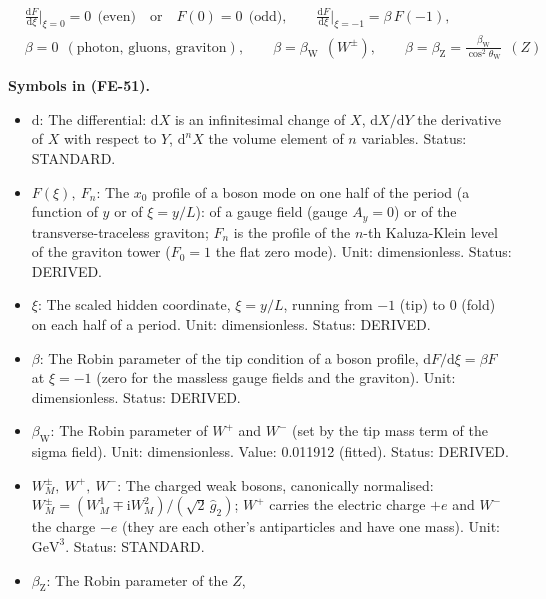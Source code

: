 \documentclass[
  10pt,
]{article}
\providecommand{\tightlist}{%
  \setlength{\itemsep}{0pt}\setlength{\parskip}{0pt}}
\begin{document}
\[
\begin{aligned}
&\frac{\mathrm{d}F}{\mathrm{d}\xi}\Big\vert_{\xi=0} = 0\ \ \text{(even)}\quad\text{or}\quad F(0) =
 0\ \ \text{(odd)},\qquad
 \frac{\mathrm{d}F}{\mathrm{d}\xi}\Big\vert_{\xi=-1} = \beta\,F(-1),\\
&\beta = 0\ \ (\text{photon, gluons, graviton}),\qquad \beta = \beta_{\mathrm{W}}\ \ (W^\pm),\qquad
 \beta = \beta_{\mathrm{Z}} = \frac{\beta_{\mathrm{W}}}{\cos^2\theta_{\mathrm{W}}}\ \ (Z)
\end{aligned} \tag{FE-51}
\]

\textbf{Symbols in (FE-51).}

\begin{itemize}
\tightlist
\item
  \(\mathrm{d}\): The differential: \(\mathrm{d}X\) is an infinitesimal
  change of \(X\), \(\mathrm{d}X/\mathrm{d}Y\) the derivative of \(X\)
  with respect to \(Y\), \(\mathrm{d}^nX\) the volume element of \(n\)
  variables. Status: STANDARD.
\item
  \(F(\xi),\ F_n\): The \(x_0\) profile of a boson mode on one half of
  the period (a function of \(y\) or of \(\xi = y/L\)): of a gauge field
  (gauge \(A_y = 0\)) or of the transverse-traceless graviton; \(F_n\)
  is the profile of the \(n\)-th Kaluza-Klein level of the graviton
  tower (\(F_0 = 1\) the flat zero mode). Unit: dimensionless. Status:
  DERIVED.
\item
  \(\xi\): The scaled hidden coordinate, \(\xi = y/L\), running from
  \(-1\) (tip) to \(0\) (fold) on each half of a period. Unit:
  dimensionless. Status: DERIVED.
\item
  \(\beta\): The Robin parameter of the tip condition of a boson
  profile, \(\mathrm{d}F/\mathrm{d}\xi = \beta F\) at \(\xi = -1\) (zero
  for the massless gauge fields and the graviton). Unit: dimensionless.
  Status: DERIVED.
\item
  \(\beta_{\mathrm{W}}\): The Robin parameter of \(W^+\) and \(W^-\)
  (set by the tip mass term of the sigma field). Unit: dimensionless.
  Value: 0.011912 (fitted). Status: DERIVED.
\item
  \(W^\pm_M,\ W^+,\ W^-\): The charged weak bosons, canonically
  normalised:
  \(W^\pm_M = (W^1_M \mp \mathrm{i}W^2_M)/(\sqrt2\,\hat g_2)\); \(W^+\)
  carries the electric charge \(+e\) and \(W^-\) the charge \(-e\) (they
  are each other's antiparticles and have one mass). Unit:
  \(\mathrm{GeV}^{3}\). Status: STANDARD.
\item
  \(\beta_{\mathrm{Z}}\): The Robin parameter of the \(Z\),

\end{itemize}
\end{document}
